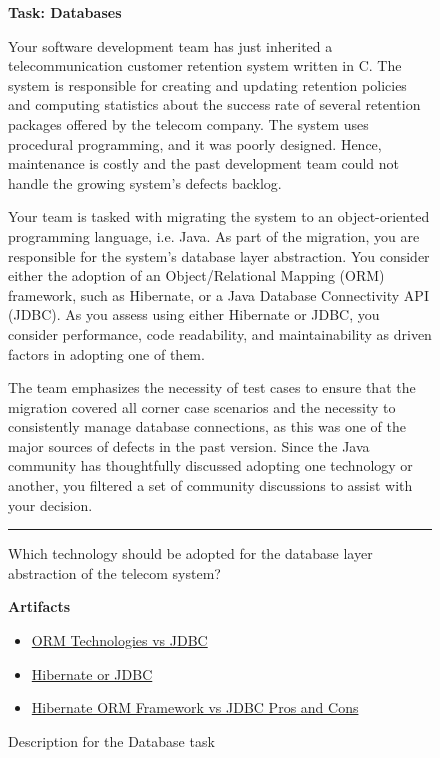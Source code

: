 \begin{figure}
\begin{mdframed}[backgroundcolor=gray!05] 
\begin{scriptsize}

{\large \textbf{Task: Databases}} \bigskip


Your software development team has just inherited a telecommunication customer retention system written in C. The system is responsible for creating and updating retention policies and computing
statistics about the success rate of several retention packages offered by the telecom company. The system uses procedural programming, and it was poorly designed. Hence, maintenance is costly and the
past development team could not handle the growing system's defects backlog. \medskip


Your team is tasked with migrating the system to an object-oriented programming language, i.e. Java. As part of the migration, you are responsible for the system's database layer abstraction. You consider either the adoption of an Object/Relational Mapping (ORM) framework, such as Hibernate, or a Java Database Connectivity API (JDBC). As you assess using either Hibernate or JDBC, you consider performance,
code readability, and maintainability as driven factors in adopting one of them.  \medskip

The team emphasizes the necessity of test cases to ensure that the migration covered all corner case scenarios and the necessity to consistently manage database connections, as this was one of the major sources of defects in the past version. Since the Java community has thoughtfully discussed adopting one technology or another, you filtered a set of community discussions to assist with your decision.


\begin{center}
\rule{10cm}{0.4pt}
\end{center}

Which technology should be adopted for the database layer abstraction of the telecom system?

\medskip

\textbf{Artifacts}

\begin{itemize}
    \item \href{https://stackoverflow.com/questions/1575762/orm-technologies-vs-jdbc}{ORM Technologies vs JDBC}
    \item \href{https://stackoverflow.com/questions/1353137/hibernate-or-jdbc}{Hibernate or JDBC}
    \item \href{https://stackoverflow.com/questions/35955020/hibernate-orm-framework-vs-jdbc-pros-and-cons}{Hibernate ORM Framework vs JDBC Pros and Cons}
\end{itemize}

\end{scriptsize}
\end{mdframed}
\caption{Description for the Database task}
\end{figure}

    
